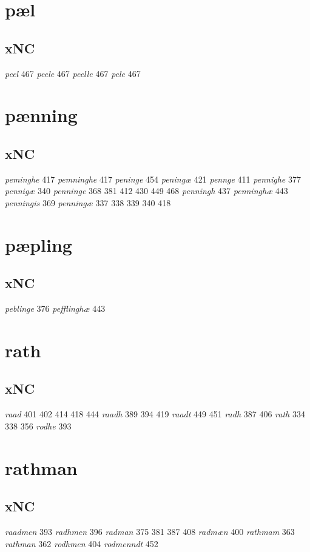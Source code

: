 \documentclass[a4paper,twocolumn]{article}
\begin{document}
\section{pæl}
\label{sec:orga119894}
\subsection{xNC}
\label{sec:org4bea448}
\emph{peel} 467 \emph{peele} 467 \emph{peelle} 467 \emph{pele} 467 
\section{pænning}
\label{sec:orgb7a9b78}
\subsection{xNC}
\label{sec:org71a1f43}
\emph{peminghe} 417 \emph{pemninghe} 417 \emph{peninge} 454 \emph{peningæ} 421 \emph{pennge} 411 \emph{pennighe} 377 \emph{pennigæ} 340 \emph{penninge} 368 381 412 430 449 468 \emph{penningh} 437 \emph{penninghæ} 443 \emph{penningis} 369 \emph{penningæ} 337 338 339 340 418 
\section{pæpling}
\label{sec:org05672d2}
\subsection{xNC}
\label{sec:orge7512bf}
\emph{peblinge} 376 \emph{pefflinghæ} 443 
\section{rath}
\label{sec:orgaae32df}
\subsection{xNC}
\label{sec:orgd3a32a0}
\emph{raad} 401 402 414 418 444 \emph{raadh} 389 394 419 \emph{raadt} 449 451 \emph{radh} 387 406 \emph{rath} 334 338 356 \emph{rodhe} 393 
\section{rathman}
\label{sec:orgf1f94dd}
\subsection{xNC}
\label{sec:orgf422075}
\emph{raadmen} 393 \emph{radhmen} 396 \emph{radman} 375 381 387 408 \emph{radmæn} 400 \emph{rathmam} 363 \emph{rathman} 362 \emph{rodhmen} 404 \emph{rodmenndt} 452 
\end{document}
